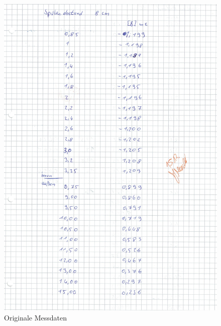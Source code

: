 \begin{figure}[h!]
  \centering
  \includegraphics[width=\textwidth]{OMD5.pdf}
  \caption{Originale Messdaten}
  \label{fig:OMD5}
\end{figure}

